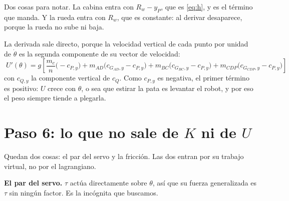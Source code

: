 \documentclass[11pt,a4paper]{article}
\begin{document}
Dos cosas para notar. La cabina entra con \(R_w-y_P\), que es \eqref{eq:h}, y es el término que manda. Y la
rueda entra con \(R_w\), que es constante: al derivar desaparece, porque la rueda no sube ni baja.

La derivada sale directo, porque la velocidad vertical de cada punto por unidad de \(\dot\theta\) es la segunda
componente de su vector de velocidad:
\begin{equation}
\boxed{\;
U'(\theta)=g\left[\frac{m_c}{n}\bigl(-c_{P,y}\bigr)
+m_{AD}\bigl(c_{G_{AD},y}-c_{P,y}\bigr)+m_{BC}\bigl(c_{G_{BC},y}-c_{P,y}\bigr)+m_{CDP}\bigl(c_{G_{CDP},y}-c_{P,y}\bigr)\right]
\;}
\label{eq:dU}
\end{equation}
con \(c_{Q,y}\) la componente vertical de \(c_Q\). Como \(c_{P,y}\) es negativa, el primer término es positivo:
\(U\) crece con \(\theta\), o sea que estirar la pata es levantar el robot, y por eso el peso siempre tiende a
plegarla.

\section{Paso 6: lo que no sale de \(K\) ni de \(U\)}

Quedan dos cosas: el par del servo y la fricción. Las dos entran por su trabajo virtual, no por el
lagrangiano.

\textbf{El par del servo.} \(\tau\) actúa directamente sobre \(\theta\), así que su fuerza generalizada es
\(\tau\) sin ningún factor. Es la incógnita que buscamos.
\end{document}
